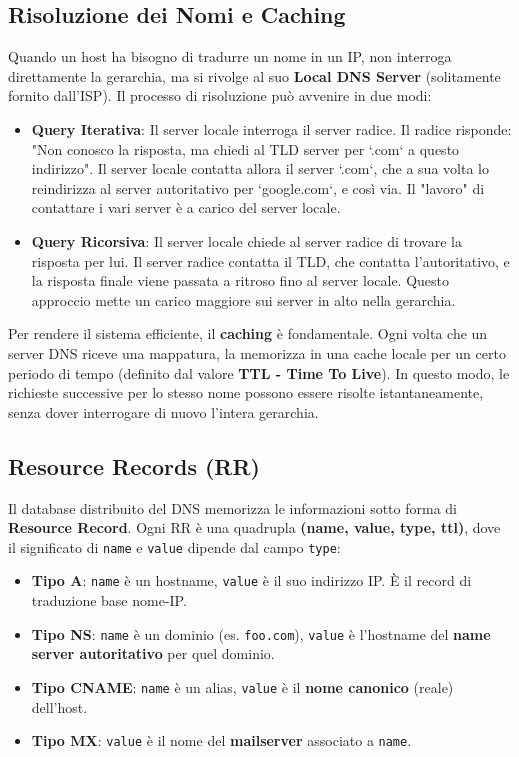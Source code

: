\subsection{Risoluzione dei Nomi e Caching}
Quando un host ha bisogno di tradurre un nome in un IP, non interroga direttamente la gerarchia, ma si rivolge al suo \textbf{Local DNS Server} (solitamente fornito dall'ISP).
Il processo di risoluzione può avvenire in due modi:
\begin{itemize}
    \item \textbf{Query Iterativa}: Il server locale interroga il server radice. Il radice risponde: "Non conosco la risposta, ma chiedi al TLD server per `.com` a questo indirizzo". Il server locale contatta allora il server `.com`, che a sua volta lo reindirizza al server autoritativo per `google.com`, e così via. Il "lavoro" di contattare i vari server è a carico del server locale.
    \item \textbf{Query Ricorsiva}: Il server locale chiede al server radice di trovare la risposta per lui. Il server radice contatta il TLD, che contatta l'autoritativo, e la risposta finale viene passata a ritroso fino al server locale. Questo approccio mette un carico maggiore sui server in alto nella gerarchia.
\end{itemize}
Per rendere il sistema efficiente, il \textbf{caching} è fondamentale. Ogni volta che un server DNS riceve una mappatura, la memorizza in una cache locale per un certo periodo di tempo (definito dal valore \textbf{TTL - Time To Live}). In questo modo, le richieste successive per lo stesso nome possono essere risolte istantaneamente, senza dover interrogare di nuovo l'intera gerarchia.

\subsection{Resource Records (RR)}
Il database distribuito del DNS memorizza le informazioni sotto forma di \textbf{Resource Record}. Ogni RR è una quadrupla \textbf{(name, value, type, ttl)}, dove il significato di \texttt{name} e \texttt{value} dipende dal campo \texttt{type}:
\begin{itemize}
    \item \textbf{Tipo A}: \texttt{name} è un hostname, \texttt{value} è il suo indirizzo IP. È il record di traduzione base nome-IP.
    \item \textbf{Tipo NS}: \texttt{name} è un dominio (es. \texttt{foo.com}), \texttt{value} è l'hostname del \textbf{name server autoritativo} per quel dominio.
    \item \textbf{Tipo CNAME}: \texttt{name} è un alias, \texttt{value} è il \textbf{nome canonico} (reale) dell'host.
    \item \textbf{Tipo MX}: \texttt{value} è il nome del \textbf{mailserver} associato a \texttt{name}.
\end{itemize}

